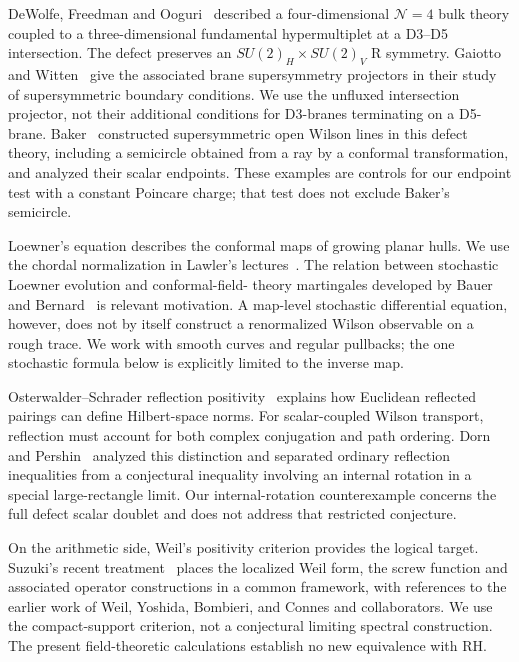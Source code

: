 DeWolfe, Freedman and Ooguri~\cite{DFO} described a four-dimensional
$\mathcal N=4$ bulk theory coupled to a three-dimensional fundamental
hypermultiplet at a D3--D5 intersection. The defect preserves an
$SU(2)_H\times SU(2)_V$ R symmetry. Gaiotto and Witten~\cite{GW} give
the associated brane supersymmetry projectors in their study of
supersymmetric boundary conditions. We use the unfluxed intersection
projector, not their additional conditions for D3-branes terminating on
a D5-brane. Baker~\cite{Baker} constructed supersymmetric open Wilson
lines in this defect theory, including a semicircle obtained from a ray
by a conformal transformation, and analyzed their scalar endpoints.
These examples are controls for our endpoint test with a constant
Poincare charge; that test does not exclude Baker's semicircle.

Loewner's equation describes the conformal maps of growing planar hulls.
We use the chordal normalization in Lawler's lectures~\cite{Lawler}.
The relation between stochastic Loewner evolution and conformal-field-
theory martingales developed by Bauer and Bernard~\cite{BauerBernard}
is relevant motivation. A map-level stochastic differential equation,
however, does not by itself construct a renormalized Wilson observable
on a rough trace. We work with smooth curves and regular pullbacks;
the one stochastic formula below is explicitly limited to the inverse map.

Osterwalder--Schrader reflection positivity~\cite{OS} explains how
Euclidean reflected pairings can define Hilbert-space norms. For
scalar-coupled Wilson transport, reflection must account for both
complex conjugation and path ordering. Dorn and Pershin~\cite{DP}
analyzed this distinction and separated ordinary reflection inequalities
from a conjectural inequality involving an internal rotation in a
special large-rectangle limit. Our internal-rotation counterexample
concerns the full defect scalar doublet and does not address that
restricted conjecture.

On the arithmetic side, Weil's positivity criterion provides the
logical target. Suzuki's recent treatment~\cite{Suzuki} places the
localized Weil form, the screw function and associated operator
constructions in a common framework, with references to the earlier
work of Weil, Yoshida, Bombieri, and Connes and collaborators.
We use the compact-support criterion, not a conjectural limiting
spectral construction. The present field-theoretic calculations establish
no new equivalence with RH.

